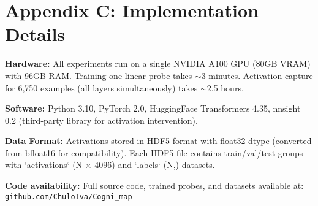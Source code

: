 \documentclass[letterpaper]{article}
\begin{document}
\section{Appendix C: Implementation Details}

\textbf{Hardware:} All experiments run on a single NVIDIA A100 GPU (80GB VRAM) with 96GB RAM. Training one linear probe takes $\sim$3 minutes. Activation capture for 6,750 examples (all layers simultaneously) takes $\sim$2.5 hours.

\textbf{Software:} Python 3.10, PyTorch 2.0, HuggingFace Transformers 4.35, nnsight 0.2 (third-party library for activation intervention).

\textbf{Data Format:} Activations stored in HDF5 format with float32 dtype (converted from bfloat16 for compatibility). Each HDF5 file contains train/val/test groups with `activations` (N × 4096) and `labels` (N,) datasets.

\textbf{Code availability:} Full source code, trained probes, and datasets available at: \texttt{github.com/ChuloIva/Cogni\_map}
\end{document}
